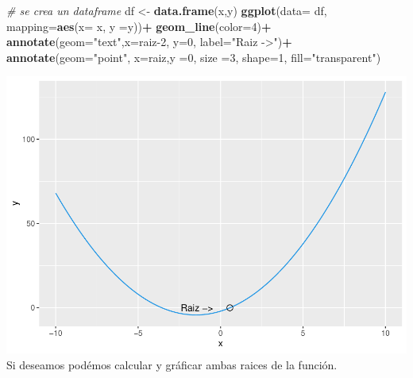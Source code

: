 \documentclass[11pt,]{article}
\newenvironment{Shaded}{\begin{snugshade}}{\end{snugshade}}
\newcommand{\CommentTok}[1]{\textcolor[rgb]{0.56,0.35,0.01}{\textit{#1}}}
\newcommand{\DataTypeTok}[1]{\textcolor[rgb]{0.13,0.29,0.53}{#1}}
\newcommand{\DecValTok}[1]{\textcolor[rgb]{0.00,0.00,0.81}{#1}}
\newcommand{\KeywordTok}[1]{\textcolor[rgb]{0.13,0.29,0.53}{\textbf{#1}}}
\newcommand{\NormalTok}[1]{#1}
\newcommand{\OperatorTok}[1]{\textcolor[rgb]{0.81,0.36,0.00}{\textbf{#1}}}
\newcommand{\StringTok}[1]{\textcolor[rgb]{0.31,0.60,0.02}{#1}}
\begin{document}
\begin{Shaded}
\begin{Highlighting}[]
\CommentTok{# se crea un dataframe}
\NormalTok{df <-}\StringTok{ }\KeywordTok{data.frame}\NormalTok{(x,y)  }
\KeywordTok{ggplot}\NormalTok{(}\DataTypeTok{data=}\NormalTok{ df, }\DataTypeTok{mapping=}\KeywordTok{aes}\NormalTok{(}\DataTypeTok{x=}\NormalTok{ x, }\DataTypeTok{y =}\NormalTok{y))}\OperatorTok{+}
\StringTok{  }\KeywordTok{geom_line}\NormalTok{(}\DataTypeTok{color=}\DecValTok{4}\NormalTok{)}\OperatorTok{+}
\StringTok{  }\KeywordTok{annotate}\NormalTok{(}\DataTypeTok{geom=}\StringTok{"text"}\NormalTok{,}\DataTypeTok{x=}\NormalTok{raiz}\DecValTok{-2}\NormalTok{, }\DataTypeTok{y=}\DecValTok{0}\NormalTok{, }\DataTypeTok{label=}\StringTok{"Raiz ->"}\NormalTok{)}\OperatorTok{+}
\StringTok{  }\KeywordTok{annotate}\NormalTok{(}\DataTypeTok{geom=}\StringTok{"point"}\NormalTok{, }\DataTypeTok{x=}\NormalTok{raiz,}\DataTypeTok{y =}\DecValTok{0}\NormalTok{, }\DataTypeTok{size =}\DecValTok{3}\NormalTok{, }\DataTypeTok{shape=}\DecValTok{1}\NormalTok{, }\DataTypeTok{fill=}\StringTok{"transparent"}\NormalTok{)}
\end{Highlighting}
\end{Shaded}

\includegraphics{Newton_raphson_files/figure-latex/unnamed-chunk-4-1.pdf}
\newpage Si deseamos podémos calcular y gráficar ambas raices de la
función.
\end{document}
